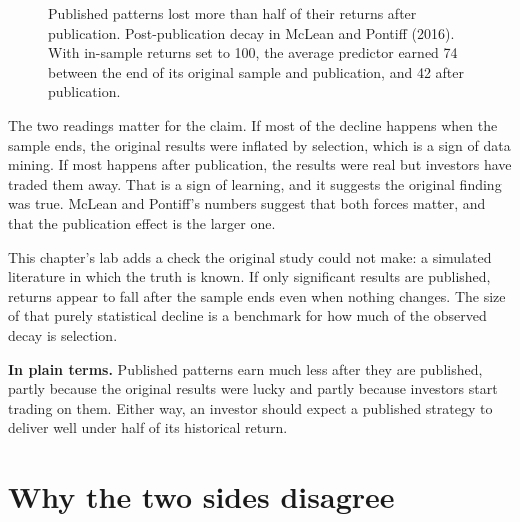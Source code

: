 \begin{figure}[htbp]
\centering
{}
\caption{Published patterns lost more than half of their returns after publication. Post-publication decay in McLean and Pontiff (2016). With in-sample returns set to 100, the average predictor earned 74 between the end of its original sample and publication, and 42 after publication.}
\label{fig:19-decay}
\end{figure}

The two readings matter for the claim. If most of the decline happens when the sample ends, the original results were inflated by selection, which is a sign of data mining. If most happens after publication, the results were real but investors have traded them away. That is a sign of learning, and it suggests the original finding was true. McLean and Pontiff's numbers suggest that both forces matter, and that the publication effect is the larger one.

This chapter's lab adds a check the original study could not make: a simulated literature in which the truth is known. If only significant results are published, returns appear to fall after the sample ends even when nothing changes. The size of that purely statistical decline is a benchmark for how much of the observed decay is selection.

\noindent\textbf{In plain terms.} Published patterns earn much less after they are published, partly because the original results were lucky and partly because investors start trading on them. Either way, an investor should expect a published strategy to deliver well under half of its historical return.

\section{Why the two sides disagree}
\label{sec:19-why}

